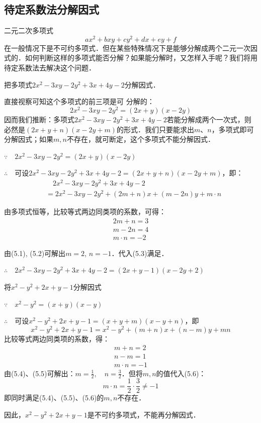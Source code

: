 \subsection{待定系数法分解因式}
二元二次多项式
\[ax^2+bxy+cy^2+dx+ey+f\]
在一般情况下是不可约多项式．但在某些特殊情况下是能够分解成两个二元一次因式的．如何判断这样的多项式能否分解？如果能分解时，又怎样入手呢？我们将用待定系数法去解决这个问题．



\begin{example}
    把多项式$2x^2-3xy-2y^2+3x+4y-2$分解因式．
\end{example}

\begin{analyze}
   直接视察可知这个多项式的前三项是可
    分解的：$$2x^2-3xy-2y^2=(2x+y)(x-2y)$$
 因而我们推断：多项式$2x^2-3xy-2y^2+3x+4y-2$若能分解成两个一次式，则必然是$(2x+y+n)(x-2y+m)$的形式．我们只要能求出$m$、$n$，多项式即可分解因式；如果$m, n$不存在，就可断定，这个多项式不能分解因式．   
\end{analyze}

\begin{solution}
$\because\quad 2x^2-3xy-2y^2=(2x+y)(x-2y)$

$\therefore\quad $可设$2x^2-3xy-2y^2+3x+4y-2=(2x+y+n)(x-2y+m)$，即：
\[\begin{split}
   &\quad 2x^2-3xy-2y^2+3x+4y-2\\
   &=2x^2-3xy-2y^2+(2m+n)x+(m-2n)y+m\cdot n 
\end{split}\]

由多项式恒等，比较等式两边同类项的系数，可得：
\begin{align}
        2m+n=3\\
        m-2n=4\\
        m\cdot n=-2
\end{align}

由(5.1), (5.2)可解出$m=2$, $n=-1$．代入(5.3)满足．

$\therefore\quad 2x^2-3xy-2y^2+3x+4y-2=(2x+y-1) (x-2y+2)$
\end{solution}


\begin{example}
    将$x^2-y^2+2x+y-1$分解因式
\end{example}


\begin{solution}
    $\because\quad x^2-y^2=(x+y)(x-y)$

$\therefore\quad $可设$x^2-y^2+2x+y-1=(x+y+m) (x-y+n)$，即
\[x^2-y^2+2x+y-1=x^2-y^2+ (m+n) x+ (n-m) y+mn\]
    比较等式两边同类项的系数，得：    
\begin{align}
    m+n=2\\
    n-m=1\\
    m\cdot n=-1
\end{align}
由(5.4)、(5.5)可解出：$m=\frac{1}{2},\quad n=\frac{3}{2}$．但将$m,n$的值代入(5.6)：
\[m\cdot n=\frac{1}{2}\cdot\frac{3}{2}\ne -1\]
即同时满足(5.4)、(5.5)、(5.6)的$m,n$不存在．

因此，$x^2-y^2+2x+y-1$是不可约多项式，不能再分解因式．
\end{solution}


